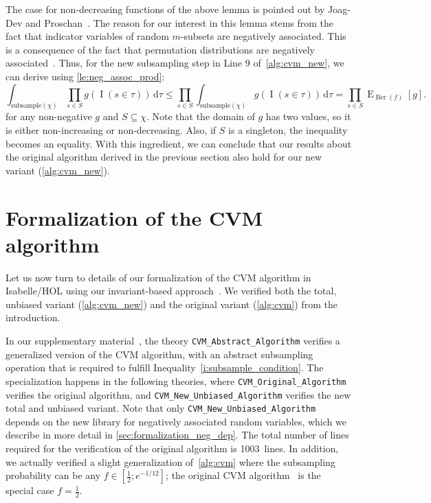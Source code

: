 \documentclass[a4paper,UKenglish,cleveref, autoref, thm-restate]{lipics-v2021}
\newcommand{\integral}[3]{\int_{#1} \! #2 \, \mathrm{d} #3}
\DeclareMathOperator{\Ber}{\mathrm{Ber}}
\DeclareMathOperator{\expect}{\mathrm{E}}
\DeclareMathOperator{\indicat}{\mathrm{I}}
\newcommand\locnew{1003}
\begin{document}
The case for non-decreasing functions of the above lemma is pointed out by Joag-Dev and Proschan~\cite[P.2]{joagdev1983}.
The reason for our interest in this lemma stems from the fact that indicator variables of random $m$-subsets are negatively associated.
This is a consequence of the fact that permutation distributions are negatively associated~\cite[Th. 2.11]{joagdev1983}.
Thus, for the new subsampling step in Line 9 of~\cref{alg:cvm_new}, we can derive using \cref{le:neg_assoc_prod}:
\begin{equation}\label{eq:subsample_with_n_subsets}
  \integral{\mathrm{subsample}(\chi)}{\prod_{s \in S} g(\indicat(s \in \tau))} {\tau} \leq
  \prod_{s \in S} \integral{\mathrm{subsample}(\chi)}{g(\indicat(s \in \tau))}{\tau} = \prod_{s \in S}  \expect_{\Ber(f)}[g] \textrm{.}
\end{equation}
for any non-negative $g$ and $S \subseteq \chi$.
Note that the domain of $g$ has two values, so it is either non-increasing or non-decreasing.
Also, if $S$ is a singleton, the inequality becomes an equality.
With this ingredient, we can conclude that our results about the original algorithm derived in the previous section also hold for our new variant (\cref{alg:cvm_new}).

\section{Formalization of the CVM algorithm}\label{sec:formalization}
Let us now turn to details of our formalization of the CVM algorithm in Isabelle/HOL using our invariant-based approach~\cite{CVM_Distinct_Elements-AFP}.
We verified both the total, unbiased variant (\cref{alg:cvm_new}) and the original variant (\cref{alg:cvm}) from the introduction.

\begin{note}
In our supplementary material~\cite{CVM_Distinct_Elements-AFP}, the theory \verb|CVM_Abstract_Algorithm| verifies a generalized version of the CVM algorithm, with an abstract subsampling operation that is required to fulfill Inequality~\ref{i:subsample_condition}.
The specialization happens in the following theories, where \verb|CVM_Original_Algorithm| verifies the original algorithm, and \verb|CVM_New_Unbiased_Algorithm| verifies the new total and unbiased variant.
Note that only \verb|CVM_New_Unbiased_Algorithm| depends on the new library for negatively associated random variables, which we describe in more detail in \cref{sec:formalization_neg_dep}.
The total number of lines required for the verification of the original algorithm is \locnew~lines.
In addition, we actually verified a slight generalization of~\cref{alg:cvm} where the subsampling probability can be any $f \in [\frac{1}{2};e^{-1/12}]$; the original CVM algorithm~\cite{chakraborty2022} is the special case $f=\frac{1}{2}$.
\lipicsEnd\end{note}
\end{document}
